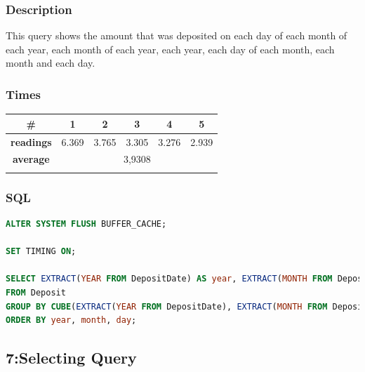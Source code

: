 \documentclass[a4paper, 10pt]{article}
\begin{document}
\subsubsection{Description}
This query shows the amount that was deposited on each day of each month of each year, each month of each year, each year, each day of each month, each month and each day.
\subsubsection{Times}
\begin{table}[H]
\centering
\begin{tabular}{cccccc}
\hline
\multicolumn{1}{|c|}{\textbf{\#}}       & \multicolumn{1}{c|}{\textbf{1}} & \multicolumn{1}{c|}{\textbf{2}} & \multicolumn{1}{c|}{\textbf{3}} & \multicolumn{1}{c|}{\textbf{4}} & \multicolumn{1}{c|}{\textbf{5}} \\ \hline
\multicolumn{1}{|c|}{\textbf{readings}} & \multicolumn{1}{c|}{6.369}           & \multicolumn{1}{c|}{3.765}           & \multicolumn{1}{c|}{3.305}           & \multicolumn{1}{c|}{3.276}           & \multicolumn{1}{c|}{2.939}           \\ \hline
\multicolumn{1}{|c|}{\textbf{average}}      & \multicolumn{5}{c|}{3,9308}                                                                                                                                                   \\ \hline
\textbf{}                               & \textbf{}                       & \textbf{}                       & \textbf{}                       & \textbf{}                       & \textbf{}                      
\end{tabular}
\end{table}
\subsubsection{SQL}
\begin{lstlisting}[language=SQL]
ALTER SYSTEM FLUSH BUFFER_CACHE;

SET TIMING ON;

SELECT EXTRACT(YEAR FROM DepositDate) AS year, EXTRACT(MONTH FROM DepositDate) AS month, EXTRACT(DAY FROM DepositDate) AS day, SUM(amount)
FROM Deposit
GROUP BY CUBE(EXTRACT(YEAR FROM DepositDate), EXTRACT(MONTH FROM DepositDate), EXTRACT(DAY FROM DepositDate))
ORDER BY year, month, day;
\end{lstlisting}

\subsection{7:Selecting Query}
\end{document}
